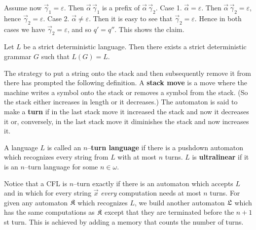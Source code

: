 Assume now $\vec{\gamma}_1 = \varepsilon$.
Then $\vec{\alpha}\, \vec{\gamma}_1$ is a prefix of
$\vec{\alpha}\, \vec{\gamma}_2$.
Case 1. $\vec{\alpha} = \varepsilon$. Then
$\vec{\alpha}\, \vec{\gamma}_2 = \varepsilon$,
hence $\vec{\gamma}_2 = \varepsilon$.
Case 2. $\vec{\alpha} \neq \varepsilon$.
Then it is easy to see that $\vec{\gamma}_2 =
\varepsilon$. Hence in both cases we have
$\vec{\gamma}_2 = \varepsilon$, and so $q' = q''$.
This shows the claim.
\proofend
\begin{thm}
Let $L$ be a strict deterministic language. Then there exists
a strict deterministic grammar $G$ such that $L(G) = L$.
\end{thm}
The strategy to put a string onto the stack and then subsequently
remove it from there has prompted the following definition.
A \textbf{stack move} is a move where the machine writes a symbol
onto the stack or removes a symbol from the stack. (So the stack
either increases in length or it decreases.) The automaton is said
to make a \textbf{turn} if in the last stack move it increased the
stack and now it decreases it or, conversely, in the last stack
move it diminishes the stack and now increases it.
\begin{defn}
A language $L$ is called an $n$--\textbf{turn language} if there is
a pushdown automaton which recognizes every string from $L$
with at most $n$ turns. $L$ is \textbf{ultralinear} if it is an
$n$--turn language for some $n \in \omega$.
\end{defn}
Notice that a CFL is $n$--turn exactly if there
is an automaton which accepts $L$ and in which for every
string $\vec{x}$ {\it every\/} computation needs at most
$n$ turns. For given any automaton $\mathfrak{K}$ which recognizes
$L$, we build another automaton $\mathfrak{L}$ which has the same
computations as $\mathfrak{K}$ except that they are terminated before
the $n+1$st turn. This is achieved by adding a memory that
counts the number of turns.

